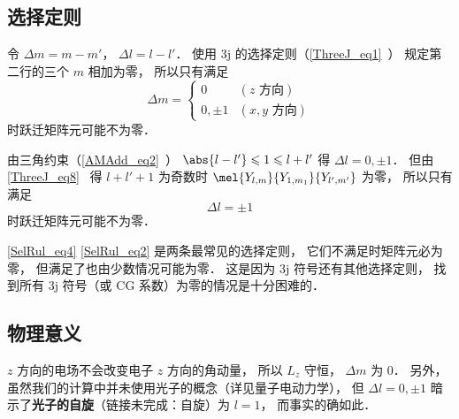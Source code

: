\subsection{选择定则}
令 $\Delta m = m - m'$， $\Delta l = l - l'$． 使用 3j 的选择定则（\autoref{ThreeJ_eq1}~） 规定第二行的三个 $m$ 相加为零， 所以只有满足
\begin{equation}\label{SelRul_eq4}
\Delta m =
\begin{cases}
0 & (\text{$z$ 方向}) \\
0, \pm 1 & (\text{$x, y$ 方向})
\end{cases}
\end{equation}
时跃迁矩阵元可能不为零．

由三角约束（\autoref{AMAdd_eq2}~） $\abs{l-l'} \leqslant 1 \leqslant l + l'$ 得 $\Delta l = 0, \pm 1$． 但由\autoref{ThreeJ_eq8}~ 得 $l + l' + 1$ 为奇数时 $\mel{Y_{l,m}}{Y_{1,m_1}}{Y_{l',m'}}$ 为零， 所以只有满足
\begin{equation}\label{SelRul_eq2}
 \Delta l = \pm 1
\end{equation}
时跃迁矩阵元可能不为零．

\autoref{SelRul_eq4} \autoref{SelRul_eq2} 是两条最常见的选择定则， 它们不满足时矩阵元必为零， 但满足了也由少数情况可能为零． 这是因为 3j 符号还有其他选择定则， 找到所有 3j 符号（或 CG 系数）为零的情况是十分困难的．


\subsection{物理意义}
$z$ 方向的电场不会改变电子 $z$ 方向的角动量， 所以 $L_z$ 守恒， $\Delta m$ 为 0． 另外， 虽然我们的计算中并未使用光子的概念（详见量子电动力学）， 但 $\Delta l = 0, \pm 1$ 暗示了\textbf{光子的自旋}（链接未完成：自旋）为 $l=1$， 而事实的确如此．

